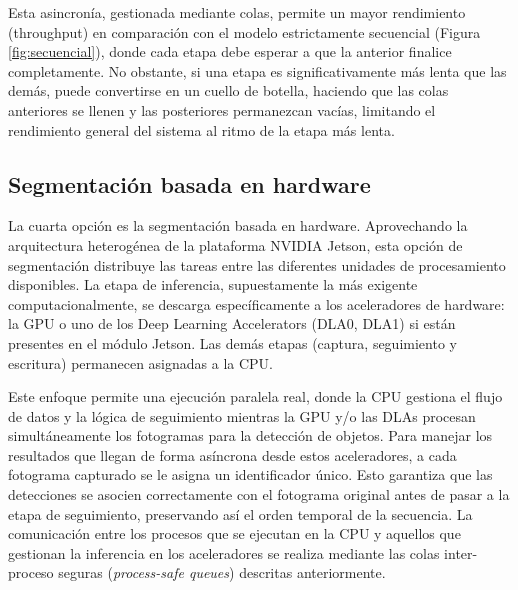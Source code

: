 \documentclass[11pt,spanish,listoffigures,listoftables]{tfgetsinf}
\begin{document}
Esta asincronía, gestionada mediante colas, permite un mayor rendimiento (throughput) en comparación con el modelo estrictamente secuencial (Figura \ref{fig:secuencial}), donde cada etapa debe esperar a que la anterior finalice completamente. No obstante, si una etapa es significativamente más lenta que las demás, puede convertirse en un cuello de botella, haciendo que las colas anteriores se llenen y las posteriores permanezcan vacías, limitando el rendimiento general del sistema al ritmo de la etapa más lenta.


\subsection{Segmentación basada en hardware} \label{sub:segmentacion_hardware}
La cuarta opción es la segmentación basada en hardware. Aprovechando la arquitectura heterogénea de la plataforma NVIDIA Jetson, esta opción de segmentación distribuye las tareas entre las diferentes unidades de procesamiento disponibles. La etapa de inferencia, supuestamente la más exigente computacionalmente, se descarga específicamente a los aceleradores de hardware: la GPU o uno de los Deep Learning Accelerators (DLA0, DLA1) si están presentes en el módulo Jetson. Las demás etapas (captura, seguimiento y escritura) permanecen asignadas a la CPU.

Este enfoque permite una ejecución paralela real, donde la CPU gestiona el flujo de datos y la lógica de seguimiento mientras la GPU y/o las DLAs procesan simultáneamente los fotogramas para la detección de objetos. Para manejar los resultados que llegan de forma asíncrona desde estos aceleradores, a cada fotograma capturado se le asigna un identificador único. Esto garantiza que las detecciones se asocien correctamente con el fotograma original antes de pasar a la etapa de seguimiento, preservando así el orden temporal de la secuencia. La comunicación entre los procesos que se ejecutan en la CPU y aquellos que gestionan la inferencia en los aceleradores se realiza mediante las colas inter-proceso seguras (\textit{process-safe queues}) descritas anteriormente.
\end{document}
